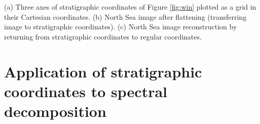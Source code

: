 {(a) Three axes of stratigraphic coordinates of Figure \ref{fig:win} plotted as a grid in their Cartesian coordinates. (b) North Sea image after flattening (transferring image to stratigraphic coordinates). (c) North Sea image reconstruction by returning from stratigraphic coordinates to regular coordinates.}



\section{Application of stratigraphic coordinates to spectral decomposition}

